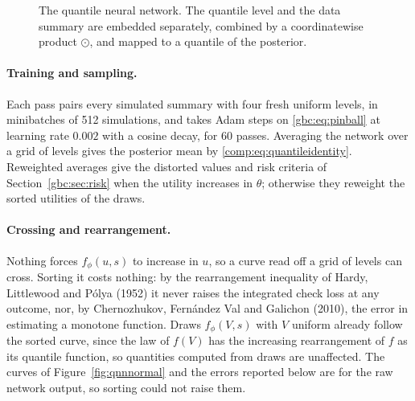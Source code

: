 \begin{figure}[ht]
\centering
{}
\caption{The quantile neural network. The quantile level and the data summary are embedded separately, combined by a coordinatewise product $\odot$, and mapped to a quantile of the posterior.}
\label{fig:qnnarch}
\end{figure}

\paragraph{Training and sampling.}  Each pass pairs every simulated summary with four fresh uniform levels, in minibatches of 512 simulations, and takes Adam steps on \eqref{gbc:eq:pinball} at learning rate $0.002$ with a cosine decay, for 60 passes. Averaging the network over a grid of levels gives the posterior mean by \eqref{comp:eq:quantileidentity}. Reweighted averages give the distorted values and risk criteria of Section~\ref{gbc:sec:risk} when the utility increases in $\theta$; otherwise they reweight the sorted utilities of the draws.

\paragraph{Crossing and rearrangement.} Nothing forces $f_\phi(u,s)$ to increase in $u$, so a curve read off a grid of levels can cross. Sorting it costs nothing: by the rearrangement inequality of Hardy, Littlewood and P\'olya (1952) it never raises the integrated check loss at any outcome, nor, by Chernozhukov, Fern\'andez Val and Galichon (2010), the error in estimating a monotone function. Draws $f_\phi(V,s)$ with $V$ uniform already follow the sorted curve, since the law of $f(V)$ has the increasing rearrangement of $f$ as its quantile function, so quantities computed from draws are unaffected. The curves of Figure~\ref{fig:qnnnormal} and the errors reported below are for the raw network output, so sorting could not raise them. 

